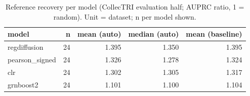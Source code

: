 \begin{table}[H]\centering\small
\caption{Reference recovery per model (CollecTRI evaluation half; AUPRC ratio, 1 = random). Unit = dataset; n per model shown.}
\begin{tabular}{lrrrr}\toprule
model & n & mean (auto) & median (auto) & mean (baseline) \\ \midrule
regdiffusion & 24 & 1.395 & 1.350 & 1.395 \\
pearson\_signed & 24 & 1.326 & 1.278 & 1.324 \\
clr & 24 & 1.302 & 1.305 & 1.317 \\
grnboost2 & 24 & 1.101 & 1.100 & 1.104 \\
\bottomrule\end{tabular}\end{table}
